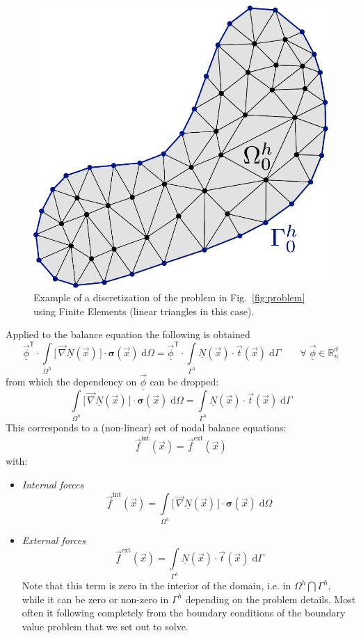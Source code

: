 \documentclass[times,namecite]{goose-article}
\begin{document}
\begin{figure}[htp]
  \centering
  \includegraphics[width=.25\textwidth]{figures/problem-discretized.pdf}
  \caption{Example of a discretization of the problem in Fig.~\ref{fig:problem} using Finite Elements (linear triangles in this case).}
  \label{fig:problem:discretized}
\end{figure}

Applied to the balance equation the following is obtained
\begin{equation}
  \underline{\vec{\phi}}^\mathsf{T} \cdot
  \int\limits_{\Omega^h}
    \big[\, \vec{\nabla} \underline{N}(\vec{x}) \,\big]
    \cdot
    \bm{\sigma}(\vec{x}) \;
  \mathrm{d}\Omega
  =
  \underline{\vec{\phi}}^\mathsf{T} \cdot
  \int\limits_{\Gamma^h}
    \underline{N}(\vec{x}) \cdot
    \vec{t}(\vec{x}) \;
  \mathrm{d}\Gamma
  \qquad
  \forall \; \underline{\vec{\phi}} \in \mathbb{R}^d_n
\end{equation}
from which the dependency on $\underline{\vec{\phi}}$ can be dropped:
\begin{equation}
  \int\limits_{\Omega^h}
    \big[\, \vec{\nabla} \underline{N}(\vec{x}) \,\big]
    \cdot
    \bm{\sigma}(\vec{x}) \;
  \mathrm{d}\Omega
  =
  \int\limits_{\Gamma^h}
    \underline{N}(\vec{x}) \cdot
    \vec{t}(\vec{x}) \;
  \mathrm{d}\Gamma
\end{equation}
This corresponds to a (non-linear) set of nodal balance equations:
\begin{equation}
  \underline{\vec{f}}^\mathrm{int}(\vec{x})
  =
  \underline{\vec{f}}^\mathrm{ext}(\vec{x})
\end{equation}
with:
\begin{itemize}
  \item \emph{Internal forces}
  \begin{equation}
    \underline{\vec{f}}^\mathrm{int}(\vec{x})
    =
    \int\limits_{\Omega^h}
      \big[\, \vec{\nabla} \underline{N}(\vec{x}) \,\big]
      \cdot
      \bm{\sigma}(\vec{x}) \;
    \mathrm{d}\Omega
  \end{equation}
  \item \emph{External forces}
  \begin{equation}
    \underline{\vec{f}}^\mathrm{ext}(\vec{x})
    =
    \int\limits_{\Gamma^h}
      \underline{N}(\vec{x}) \cdot
      \vec{t}(\vec{x}) \;
    \mathrm{d}\Gamma
  \end{equation}
  Note that this term is zero in the interior of the domain, i.e. in $\Omega^h \bigcap \Gamma^h$, while it can be zero or non-zero in $\Gamma^h$ depending on the problem details. Most often it following completely from the boundary conditions of the boundary value problem that we set out to solve.
\end{itemize}
\end{document}
